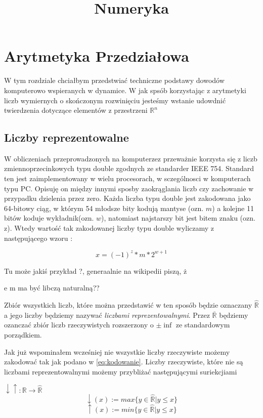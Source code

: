 \title{Numeryka}

\section{Arytmetyka Przedziałowa}
W tym rozdziale chciałbym przedstwiać techniczne podstawy dowodów komputerowo wspieranych
w dynamice. W jak spsób korzystając z arytmetyki liczb wymiernych o skończonym rozwinięciu
jesteśmy wstanie udowdnić twierdzenia dotyczące elementów z przestrzeni $ \mathbb R^n$ 

\subsection{Liczby reprezentowalne}

W obliczeniach przeprowadzonych na komputerzez przeważnie korzysta się z liczb zmiennoprzecinkowych typu double 
zgodnych ze standarder IEEE 754. Standard ten jest zaimplementowany w 
wielu procesorach, w sczególnosci w komputerach typu PC.
Opisuję on między innymi sposby zaokrąglania liczb czy zachowanie w przypadku dzielenia przez zero.
  Każda liczba typu double jest zakodowana jako 64-bitowy ciąg, w którym 54 młodsze bity kodują mantyse (ozn. $m$) a kolejne
11 bitów koduje wykładnik(ozn. $w$), natomiast najstarszy bit jest bitem znaku (ozn. z). Wtedy wartość tak zakodowanej liczby typu
double wyliczamy z następującego wzoru :

\begin{equation}\label{eq:kodowanie}
  x = (-1)^z*m*2^{w+1}
\end{equation}

Tu może jakiś przykład ?, generaalnie na wikipedii piszą, ż


e m ma być libczą naturalną??


Zbiór wszystkich liczb, które można przedstawić w ten sposób będzie oznaczany $ \hat{\mathbb{R}} $ a jego 
liczby będziemy nazywać {\em liczbami reprezentowalnymi}. Przez $ \overline{\mathbb R}$ będziemy ozanczać
zbiór liczb rzeczywistych rozszerzony o $ \pm \inf$ ze standardowym porządkiem.

Jak już wspominałem wcześniej nie wszystkie liczby rzeczywiste możemy zakodować tak jak podano w \ref{eq:kodowanie}.
Liczby rzeczywiste, które nie są liczbami reprezentowalnymi możemy przybliżać następującymi suriekcjiami

$ \downarrow \uparrow : \mathbb R \to \hat{\mathbb{R}} $
$$
  \downarrow (x) := max \{ y \in \hat{\mathbb{R}} | y \leq x \}
$$
$$
  \uparrow (x) := min \{ y \in \hat{\mathbb{R}} | y \leq x \}
$$

